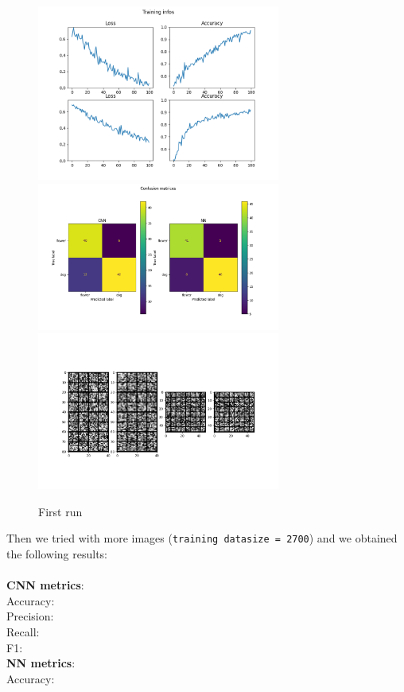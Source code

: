 \documentclass{report}
\begin{document}
\begin{figure}
    \centering
    \includegraphics[width=8cm]{images/0.82/training_infos.png}\hfill
    \includegraphics[width=8cm]{images/0.82/conf_mat.png}\hfill
    \includegraphics[width=8cm]{images/0.82/cnn_filters.png}
    \caption{First run}
    \label{fig:my_label}
\end{figure}
\newpage
Then we tried with more images (\texttt{training datasize = 2700}) and we obtained the following results:\\\\
\textbf{CNN metrics}: \\
Accuracy:\\
Precision:\\
Recall: \\
F1:\\
\textbf{NN metrics}:\\
Accuracy:\\
\end{document}
